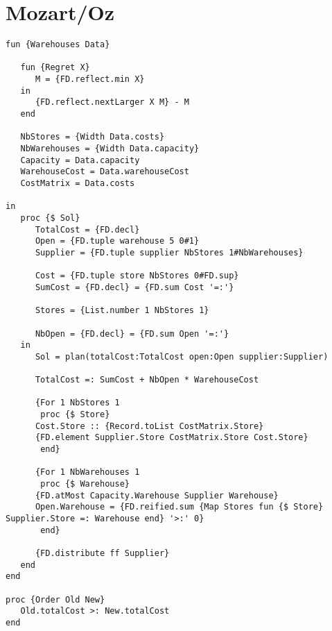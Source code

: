 \section{Mozart/Oz}

\begin{lstlisting}[language=Oz]
fun {Warehouses Data}
   
   fun {Regret X}
      M = {FD.reflect.min X}
   in
      {FD.reflect.nextLarger X M} - M
   end

   NbStores = {Width Data.costs}
   NbWarehouses = {Width Data.capacity}
   Capacity = Data.capacity
   WarehouseCost = Data.warehouseCost
   CostMatrix = Data.costs
   
in
   proc {$ Sol}
      TotalCost = {FD.decl}
      Open = {FD.tuple warehouse 5 0#1}
      Supplier = {FD.tuple supplier NbStores 1#NbWarehouses}

      Cost = {FD.tuple store NbStores 0#FD.sup}
      SumCost = {FD.decl} = {FD.sum Cost '=:'}

      Stores = {List.number 1 NbStores 1}

      NbOpen = {FD.decl} = {FD.sum Open '=:'}
   in
      Sol = plan(totalCost:TotalCost open:Open supplier:Supplier)

      TotalCost =: SumCost + NbOpen * WarehouseCost

      {For 1 NbStores 1
       proc {$ Store}
	  Cost.Store :: {Record.toList CostMatrix.Store}
	  {FD.element Supplier.Store CostMatrix.Store Cost.Store}
       end}

      {For 1 NbWarehouses 1
       proc {$ Warehouse}
	  {FD.atMost Capacity.Warehouse Supplier Warehouse}
	  Open.Warehouse = {FD.reified.sum {Map Stores fun {$ Store} Supplier.Store =: Warehouse end} '>:' 0}
       end}
      
      {FD.distribute ff Supplier}
   end
end

proc {Order Old New}
   Old.totalCost >: New.totalCost
end
\end{lstlisting}
